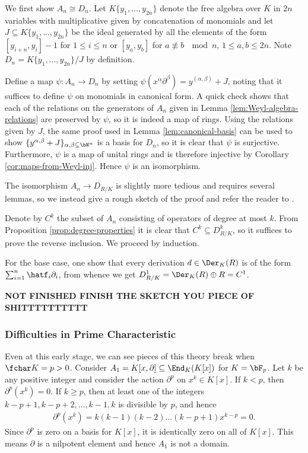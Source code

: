 \begin{prf}
	We first show $A_n \cong D_n$. Let $K\{y_1,...,y_{2n}\}$ denote the free algebra over $K$ in $2n$ variables with multiplicative given by concatenation of monomials and let $J\subseteq K\{y_1,...,y_{2n}\}$ be the ideal generated by all the elements of the form $[y_{i+n},y_{i}] - 1$ for $1\leq i\leq n$ or $[y_a,y_b]$ for $a \not\equiv b ~ \mod n$, $1\leq a,b\leq 2n$. Note $D_n = K\{y_1,...,y_{2n}\}/J$ by definition. 

	Define a map $\psi: A_n\to D_n$ by setting $\psi(x^\alpha\partial^\beta) = y^{(\alpha,\beta)} + J$, noting that it suffices to define $\psi$ on monomials in canonical form. A quick check shows that each of the relations on the generators of $A_n$ given in Lemma \ref{lem:Weyl-algebra-relations} are preserved by $\psi$, so it is indeed a map of rings. Using the relations given by $J$, the same proof used in Lemma \ref{lem:canonical-basis} can be used to show $\{y^{\alpha,\beta} + J\}_{\alpha,\beta \subseteq \bN^n}$ is a basis for $D_n$, so it is clear that $\psi$ is surjective. Furthermore, $\psi$ is a map of unital rings and is therefore injective by Corollary \ref{cor:maps-from-Weyl-inj}. Hence $\psi$ is an isomorphism.

	The isomorphism $A_n \to D_{R/K}$ is slightly more tedious and requires several lemmas, so we instead give a rough sketch of the proof and refer the reader to \cite[Chapter 3]{d-mod-primer}.

	Denote by $C^k$ the subset of $A_n$ consisting of operators of degree at most $k$. From  Proposition \ref{prop:degree-properties} it is clear that $C^k \subseteq D^k_{R/K}$, so it suffices to prove the reverse inclusion. We proceed by induction.

	For the base case, one show that every derivation $d \in \Der_K(R)$ is of the form $\sum_{i=1}^n \hatf_i\partial_i$, from whence we get $D^1_{R/K} = \Der_K(R)\oplus R = C^1$.
	
	\textbf{NOT FINISHED FINISH THE SKETCH YOU PIECE OF SHITTTTTTTTTT}
\end{prf}

\subsubsection{Difficulties in Prime Characteristic}
Even at this early stage, we can see pieces of this theory break when $\fchar K = p > 0$. Consider $A_1 = K[x,\partial]\subseteq \End_K(K[x])$ for $K = \bF_p$. Let $k$ be any positive integer and consider the action $\partial^p$ on $x^k \in K[x]$. If $k < p$, then $\partial^p(x^k) = 0$. If $k \geq p$, then at least one of the integers $k-p+1,k-p+2,...,k-1,k$ is divisible by $p$, and hence
\begin{align*}
	\partial^p(x^k) = k(k-1)(k-2)...(k-p+1)x^{k-p} = 0.
\end{align*}
Since $\partial^p$ is zero on a basis for $K[x]$, it is identically zero on all of $K[x]$. This means $\partial$ is a nilpotent element and hence $A_1$ is not a domain.

